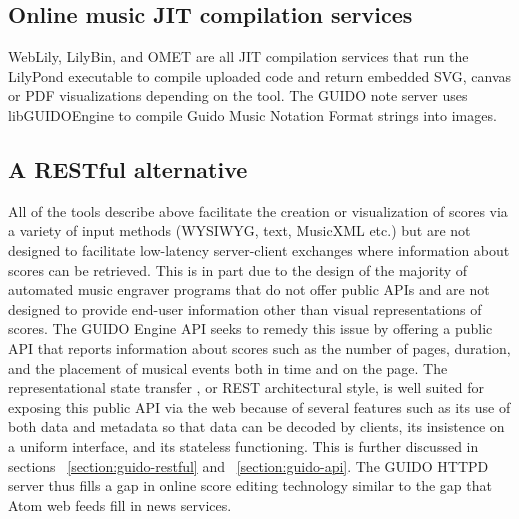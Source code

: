\documentclass{article}
\begin{document}
\subsection{Online music JIT compilation services}\label{subsection:jit}
WebLily, LilyBin, and OMET are all JIT compilation services that run the LilyPond executable to compile uploaded code and return embedded SVG, canvas or PDF visualizations depending on the tool.  The GUIDO note server \cite{renz98} uses libGUIDOEngine to compile Guido Music Notation Format \cite{hoos98} strings into images.
\subsection{A RESTful alternative}\label{subsection:restful}
All of the tools describe above facilitate the creation or visualization of scores via a variety of input methods (WYSIWYG, text, MusicXML etc.) but are not designed to facilitate low-latency server-client exchanges where information about scores can be retrieved.  This is in part due to the design of the majority of automated music engraver programs that do not offer public APIs and are not designed to provide end-user information other than visual representations of scores.  The GUIDO Engine API \cite{Dau:09a} seeks to remedy this issue by offering a public API that reports information about scores such as the number of pages, duration, and the placement of musical events both in time and on the page.  The representational state transfer \cite{Fielding00}, or REST architectural style, is well suited for exposing this public API via the web because of several features such as its use of both data and metadata so that data can be decoded by clients, its insistence on a uniform interface, and its stateless functioning.  This is further discussed in sections ~\ref{section:guido-restful} and ~\ref{section:guido-api}.  The GUIDO HTTPD server thus fills a gap in online score editing technology similar to the gap that Atom web feeds fill in news services.

\end{document}
